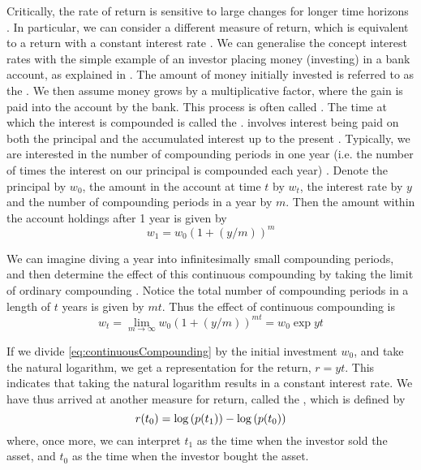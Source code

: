 Critically, the rate of return is sensitive to large changes for longer time horizons \cite{Onn02}.
In particular, we can consider a different measure of return, which is equivalent to a return with a constant interest rate \cite{Onn02}.
We can generalise the concept interest rates with the simple example of an investor placing money (investing) in a bank account, as explained in \cite{Kuh12c,Lue98}.
The amount of money initially invested is referred to as the .
We then assume money grows by a multiplicative factor, where the gain is paid into the account by the bank.
This process is often called .
The time at which the interest is compounded is called the .
 involves interest being paid on both the principal and the accumulated interest up to the present \cite{Onn02}.
Typically, we are interested in the number of compounding periods in one year (i.e. the number of times the interest on our principal is compounded each year) \cite{Kuh12c}.
Denote the principal by $w_{0}$, the amount in the account at time $t$ by $w_{t}$, the interest rate by $y$ and the number of compounding periods in a year by $m$.
Then the amount within the account holdings after 1 year is given by
\begin{equation}
	\label{eq:compoundInterest}
	w_{1} = w_{0} (1 + (y/m))^{m}
\end{equation}

We can imagine diving a year into infinitesimally small compounding periods, and then determine the effect of this continuous compounding by taking the limit of ordinary compounding \cite{Lue98}. Notice the total number of compounding periods in a length of $t$ years is given by $mt$. Thus the effect of continuous compounding is
\begin{equation}
	\label{eq:continuousCompounding}
	w_{t} = \lim_{m {\to} \infty} w_{0}(1 + (y/m))^{mt} = w_{0}\exp{yt}
\end{equation}

If we divide \cref{eq:continuousCompounding} by the initial investment $w_{0}$, and take the natural logarithm, we get a representation for the return, $r = yt$.
This indicates that taking the natural logarithm results in a constant interest rate.
We have thus arrived at another measure for return, called the , which is defined by
\begin{equation}
	\label{eq:logarithmicReturn}
	r(t_{0}) = \log \left( p(t_{1}) \right) - \log \left( p(t_{0}) \right)
\end{equation}
where, once more, we can interpret $t_{1}$ as the time when the investor sold the asset, and $t_{0}$ as the time when the investor bought the asset.

